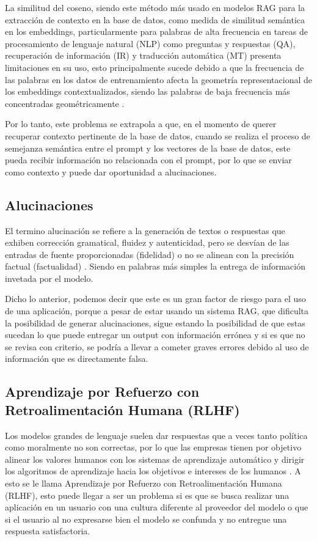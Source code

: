 La similitud del coseno, siendo este método más usado en modelos RAG para la extracción de contexto en la base de datos, 
como medida de similitud semántica en los embeddings, particularmente para palabras de alta frecuencia en tareas de 
procesamiento de lenguaje natural (NLP) como preguntas y respuestas (QA), recuperación de información (IR) y traducción 
automática (MT) presenta limitaciones en su uso, esto principalmente sucede debido a que la frecuencia de las palabras en los 
datos de entrenamiento afecta la geometría representacional de los embeddings contextualizados, siendo las palabras de baja 
frecuencia más concentradas geométricamente \cite{coseno}.

Por lo tanto, este problema se extrapola a que, en el momento de querer recuperar contexto pertinente de la base de datos, 
cuando se realiza el proceso de semejanza semántica entre el prompt y los vectores de la base de datos, este pueda recibir 
información no relacionada con el prompt, por lo que se enviar como contexto y puede dar oportunidad a alucinaciones.


\subsection{Alucinaciones}

El termino alucinación se refiere a la generación de textos o respuestas que exhiben corrección gramatical, fluidez y autenticidad,
pero se desvían de las entradas de fuente proporcionadas (fidelidad) o no se alinean con la precisión factual (factualidad) \cite{alucionacion1}.
Siendo en palabras más simples la entrega de información invetada por el modelo.

Dicho lo anterior, podemos decir que este es un gran factor de riesgo para el uso de una aplicación, porque a pesar de estar usando un 
sistema RAG, que dificulta la posibilidad de generar alucinaciones, sigue estando la posibilidad de que estas sucedan lo que puede 
entregar un output con información errónea y si es que no se revisa con criterio, se podría a llevar a cometer graves errores debido 
al uso de información que es directamente falsa.

\subsection{Aprendizaje por Refuerzo con Retroalimentación Humana (RLHF)}

Los modelos grandes de lenguaje suelen dar respuestas que a veces tanto política como moralmente no son correctas, por lo que 
las empresas tienen por objetivo alinear los valores humanos con los sistemas de aprendizaje automático y dirigir los algoritmos 
de aprendizaje hacia los objetivos e intereses de los humanos \cite{RLHF}. A esto se le llama Aprendizaje por Refuerzo con 
Retroalimentación Humana (RLHF), esto puede llegar a ser un problema si es que se busca realizar una aplicación en un usuario con una 
cultura diferente al proveedor del modelo o que si el usuario al no expresarse bien el modelo se confunda y no entregue una respuesta 
satisfactoria.
